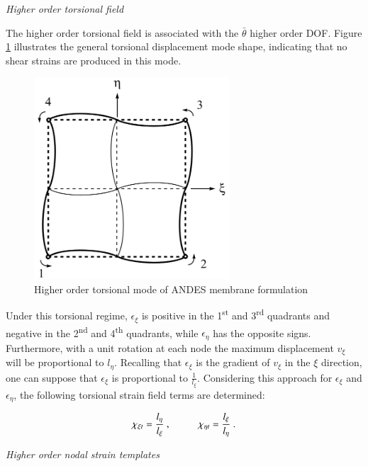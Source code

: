 \textit{Higher order torsional field}

The higher order torsional field is associated with the $\bar{\theta}$ higher order DOF. Figure \ref{fig:AndesTorsional} illustrates the general torsional displacement mode shape, indicating that no shear strains are produced in this mode.

\begin{figure}[H]
	\centering
	\def\svgwidth{\columnwidth}
	\includegraphics[width=7.3cm]{images/ANDES_torsional_mode.png}
	\caption{Higher order torsional mode of ANDES membrane formulation \cite{Hau94}}
	\label{fig:AndesTorsional}
\end{figure}

Under this torsional regime, $\epsilon_\xi$ is positive in the 1\textsuperscript{st} and 3\textsuperscript{rd} quadrants and negative in the 2\textsuperscript{nd} and 4\textsuperscript{th} quadrants, while $\epsilon_\eta$ has the opposite signs. Furthermore, with a unit rotation at each node the maximum displacement $v_\xi$ will be proportional to $l_\eta$. Recalling that $\epsilon_{\xi}$ is the gradient of $v_\xi$ in the $\xi$ direction, one can suppose that $\epsilon_{\xi}$ is proportional to $\frac{1}{l_\xi}$. Considering this approach for $\epsilon_{\xi}$ and $\epsilon_{\eta}$, the following torsional strain field terms are determined:

\begin{equation} 
\chi_{\xi t} = \frac{l_\eta}{l_\xi}\ ,
\hspace{10mm}
\chi_{\eta t} = \frac{l_\xi}{l_\eta}\ .
\label{equation13}
\end{equation}

\pagebreak

\textit{Higher order nodal strain templates}

